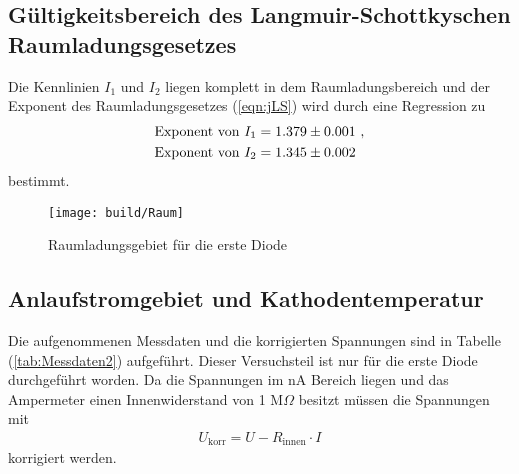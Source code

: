 \subsection{Gültigkeitsbereich des Langmuir-Schottkyschen Raumladungsgesetzes}
Die Kennlinien $I_1$ und $I_2$ liegen komplett in dem Raumladungsbereich und der Exponent des Raumladungsgesetzes (\ref{eqn:jLS}) wird durch eine Regression zu
\begin{align*}
  \text{Exponent von}\ I_1 & =  \num{1.379 +- 0.001} \ , \\
  \text{Exponent von}\ I_2 & =  \num{1.345 +- 0.002}
\end{align*}
bestimmt.

\begin{figure}[H]
  \centering
  \texttt{[image: build/Raum]}
  \caption{Raumladungsgebiet für die erste Diode}
  \label{fig:}
\end{figure}

\subsection{Anlaufstromgebiet und Kathodentemperatur}
Die aufgenommenen Messdaten und die korrigierten Spannungen sind in Tabelle (\ref{tab:Messdaten2}) aufgeführt. Dieser Versuchsteil ist nur für die erste Diode durchgeführt worden. Da die Spannungen im nA Bereich liegen und das Ampermeter einen Innenwiderstand von 1 M$\Omega$ besitzt müssen die Spannungen mit
\begin{align*}
  U_\text{korr} = U - R_\text{innen} \cdot I
\end{align*}
korrigiert werden.

